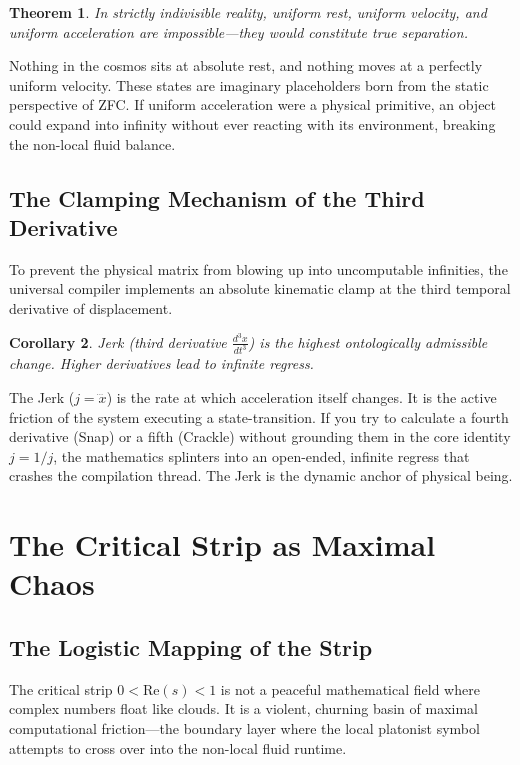 \documentclass[11pt,a4paper]{article}
\newtheorem{theorem}{Theorem}[section]
\newtheorem{corollary}[theorem]{Corollary}
\begin{document}
\begin{theorem}
In strictly indivisible reality, uniform rest, uniform velocity, and uniform acceleration are impossible—they would constitute true separation.
\end{theorem}
Nothing in the cosmos sits at absolute rest, and nothing moves at a perfectly uniform velocity. These states are imaginary placeholders born from the static perspective of ZFC. If uniform acceleration were a physical primitive, an object could expand into infinity without ever reacting with its environment, breaking the non-local fluid balance.

\subsection{The Clamping Mechanism of the Third Derivative}
To prevent the physical matrix from blowing up into uncomputable infinities, the universal compiler implements an absolute kinematic clamp at the third temporal derivative of displacement.

\begin{corollary}
Jerk (third derivative $\frac{d^3x}{dt^3}$) is the highest ontologically admissible change. Higher derivatives lead to infinite regress.
\end{corollary}
The Jerk ($j = \dddot{x}$) is the rate at which acceleration itself changes. It is the active friction of the system executing a state-transition. If you try to calculate a fourth derivative (Snap) or a fifth (Crackle) without grounding them in the core identity $j = 1/j$, the mathematics splinters into an open-ended, infinite regress that crashes the compilation thread. The Jerk is the dynamic anchor of physical being.

\section{The Critical Strip as Maximal Chaos}

\subsection{The Logistic Mapping of the Strip}
The critical strip $0 < \text{Re}(s) < 1$ is not a peaceful mathematical field where complex numbers float like clouds. It is a violent, churning basin of maximal computational friction—the boundary layer where the local platonist symbol attempts to cross over into the non-local fluid runtime.
\end{document}
